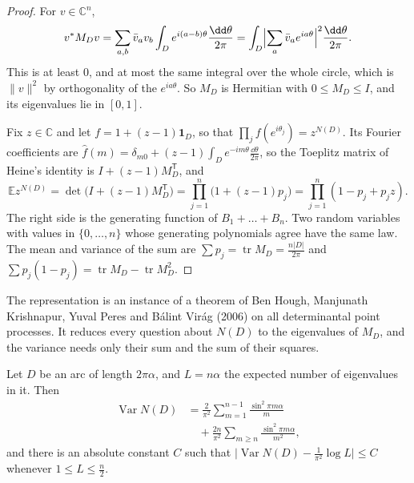\begin{proof}
For $v\in\mathbb C^n$,
\[
v^*M_Dv=\sum_{a,b}\bar v_av_b\int_De^{i(a-b)\theta}\frac{\dd\theta}{2\pi}=\int_D\Bigl|\sum_a\bar v_ae^{ia\theta}\Bigr|^2\frac{\dd\theta}{2\pi}.
\]
This is at least $0$, and at most the same integral over the whole circle, which is $\|v\|^2$ by orthogonality of
the $e^{ia\theta}$. So $M_D$ is Hermitian with $0\le M_D\le I$, and its eigenvalues lie in $[0,1]$.

Fix $z\in\mathbb C$ and let $f=1+(z-1)\mathbf 1_D$, so that $\prod_jf(e^{i\theta_j})=z^{N(D)}$. Its Fourier coefficients are $\hat f(m)=\delta_{m0}+(z-1)\int_De^{-im\theta}\frac{\dd\theta}{2\pi}$, so the Toeplitz matrix of Heine's identity is
$I+(z-1)M_D^{\mathsf T}$, and
\[
\mathbb Ez^{N(D)}=\det\bigl(I+(z-1)M_D^{\mathsf T}\bigr)=\prod_{j=1}^n\bigl(1+(z-1)p_j\bigr)=\prod_{j=1}^n(1-p_j+p_jz).
\]
The right side is the generating function of $B_1+\dots+B_n$. Two random variables with values in $\{0,\dots,n\}$ whose generating polynomials agree have the same law. The mean and variance of the sum are
$\sum p_j=\operatorname{tr}M_D=\frac{n|D|}{2\pi}$ and $\sum p_j(1-p_j)=\operatorname{tr}M_D-\operatorname{tr}M_D^2$.
\end{proof}

The representation is an instance of a theorem of Ben Hough, Manjunath Krishnapur, Yuval Peres and B\'alint Vir\'ag (2006) on all determinantal point processes. It reduces every question about $N(D)$ to the eigenvalues of
$M_D$, and the variance needs only their sum and the sum of their squares.

\begin{theorem}\label{thm:numbervariance}
Let $D$ be an arc of length $2\pi\alpha$, and $L=n\alpha$ the expected number of eigenvalues in it. Then
\begin{equation}\label{eq:numbervariance}
\begin{split}
\operatorname{Var}N(D)&=\frac2{\pi^2}\sum_{m=1}^{n-1}\frac{\sin^2\pi m\alpha}m\\
&\quad+\frac{2n}{\pi^2}\sum_{m\ge n}\frac{\sin^2\pi m\alpha}{m^2},
\end{split}
\end{equation}
and there is an absolute constant $C$ such that $\bigl|\operatorname{Var}N(D)-\frac1{\pi^2}\log L\bigr|\le C$ whenever $1\le L\le\frac n2$.
\end{theorem}

